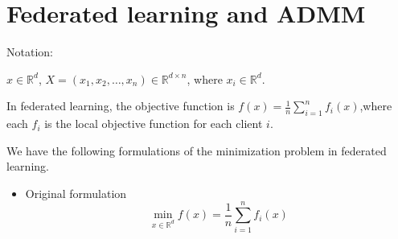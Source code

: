 \newpage 


\section{Federated learning and ADMM}
Notation:

$x \in \mathbb{R}^d$, $X = (x_1, x_2 ,\dots,x_n) \in \mathbb{R}^{d\times n}$, where $x_i \in \mathbb{R}^d$.

In federated learning, the objective function is $f(x) = \frac{1}{n} \sum_{i = 1}^n f_i(x)$,where each $f_i$ is the local objective function for each client $i$. 

We have the following formulations of the minimization problem in federated learning. 

\begin{itemize} 
    \item Original formulation \begin{equation}\label{Fed: original}
        \min_{x \in \mathbb{R}^d} f(x) = \frac{1}{n} \sum_{i = 1}^n f_i(x)
    \end{equation} 


 


\end{itemize}
